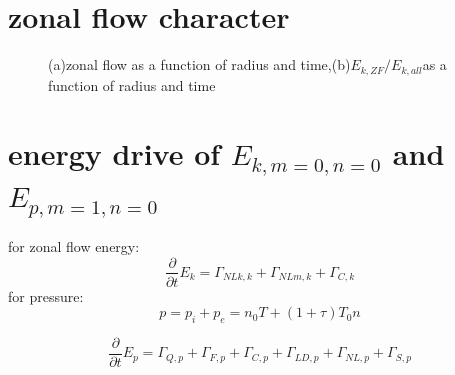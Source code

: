 \documentclass[11pt,a4paper]{article}
\begin{document}
\section{zonal flow character}

	\begin{figure}[H]
		\centering
		\caption{(a)zonal flow as a function of radius and time,(b)$E_{k,ZF}/E_{k,all}$as a function of radius and time}
	\end{figure}




\section{energy drive of $E_{k,m=0,n=0}$ and $E_{p,m=1,n=0}$}

for zonal flow energy:
\begin{equation}
\frac{\partial}{\partial{t}}E_k=\Gamma_{NLk,k}+\Gamma_{NLm,k}+\Gamma_{C,k}
\end{equation}
for pressure:
\begin{equation}
	p=p_i+p_e=n_0T+(1+\tau)T_0{n}
\end{equation}

\begin{equation}
\frac{\partial}{\partial{t}}E_p=\Gamma_{Q,p}+\Gamma_{F,p}+\Gamma_{C,p}+\Gamma_{LD,p}+\Gamma_{NL,p}+\Gamma_{S,p}
\end{equation}
\end{document}
